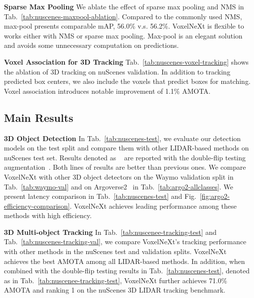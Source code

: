 \documentclass[10pt,twocolumn,letterpaper]{article}
\begin{document}
{\vspace{0.5em}
\noindent
\textbf{Sparse Max Pooling}
We ablate the effect of sparse max pooling and NMS in Tab.~\ref{tab:nuscenes-maxpool-ablation}. Compared to the commonly used NMS, max-pool presents comparable mAP, 56.0\% v.s. 56.2\%. VoxelNeXt is flexible to works either with NMS or sparse max pooling. Max-pool is an elegant solution and avoids some unnecessary computation on predictions.

\vspace{0.5em}
\noindent
\textbf{Voxel Association for 3D Tracking}
Tab.~\ref{tab:nuscenes-voxel-tracking} shows the ablation of 3D tracking on nuScenes validation. In addition to tracking predicted box centers, we also include the voxels that predict boxes for matching. Voxel association introduces notable improvement of 1.1\% AMOTA. 

\subsection{Main Results}
\noindent
\textbf{3D Object Detection}
In Tab.~\ref{tab:nuscenes-test}, we evaluate our detection models on the test split and compare them with other LIDAR-based methods on nuScenes test set.
Results denoted as ~\cite{vista, uvtr, pillarnet} are reported with the double-flip testing augmentation~\cite{centerpoint}. Both lines of results are better than previous ones. We compare VoxelNeXt with other 3D object detectors on the Waymo validation split in Tab.~\ref{tab:waymo-val} and on Argoverse2~\cite{argo2} in Tab.~\ref{tab:argo2-allclasses}. We present latency comparison in Tab.~\ref{tab:nuscenes-test} and Fig.~\ref{fig:argo2-efficiency-comparison}.
VoxelNeXt achieves leading performance among these methods with high efficiency. 

\vspace{0.1em}
\noindent
\textbf{3D Multi-object Tracking}
In Tab.~\ref{tab:nuscenee-tracking-test} and Tab.~\ref{tab:nuscenes-tracking-val}, we compare VoxelNeXt's tracking performance with other methods in the nuScenes test and validation splits. VoxelNeXt achieves the best AMOTA among all LIDAR-based methods. In addition, when combined with the double-flip testing results in Tab.~\ref{tab:nuscenes-test}, denoted as  in Tab.~\ref{tab:nuscenee-tracking-test}, VoxelNeXt further achieves 71.0\% AMOTA and ranking 1 on the nuScenes 3D LIDAR tracking benchmark.



}
\end{document}
